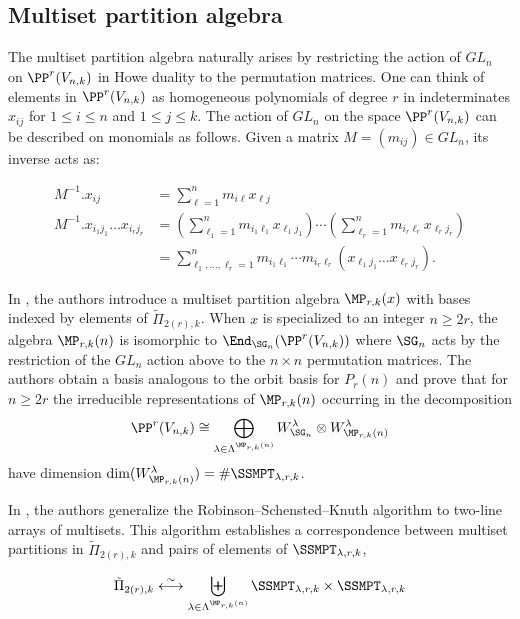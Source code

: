 \subsection{Multiset partition algebra}

The multiset partition algebra naturally arises by restricting the action of $GL_n$ on $\PP^r(V_{n,k})$ in Howe duality to the permutation matrices. One can think of elements in $\PP^r(V_{n,k})$ as homogeneous polynomials of degree $r$ in indeterminates $x_{ij}$ for $1\leq i\leq n$ and $1\leq j\leq k$. The action of $GL_n$ on the space $\PP^r(V_{n,k})$ can be described on monomials as follows. Given a matrix $M=(m_{ij})\in GL_n$, its inverse acts as:

\begin{align}
    M^{-1}.x_{ij}&=\sum_{\ell=1}^n m_{i\ell}x_{\ell j}\nonumber\\
    M^{-1}.x_{i_1j_1}\dots x_{i_rj_r}&=\left(\sum_{\ell_1=1}^n m_{i_1\ell_1}x_{\ell_1 j_1}\right)\cdots\left(\sum_{\ell_r=1}^n m_{i_r\ell_r}x_{\ell_r j_r}\right)\nonumber\\
    &=\sum_{\ell_1,\dots,\ell_r=1}^n m_{i_1\ell_1}\cdots m_{i_r\ell_r} (x_{\ell_1j_1}\dots x_{\ell_rj_r}).\label{eq:Ua_computation}
\end{align}

In \cite{orellana2020howe}, the authors introduce a multiset partition algebra $\MP_{r,k}(x)$ with bases indexed by elements of $\tilde\Pi_{2(r),k}$. When $x$ is specialized to an integer $n\geq 2r$, the algebra $\MP_{r,k}(n)$ is isomorphic to $\End_{\SG_n}(\PP^r(V_{n,k}))$ where $\SG_n$ acts by the restriction of the $GL_n$ action above to the $n\times n$ permutation matrices. The authors obtain a basis analogous to the orbit basis for $P_r(n)$ and prove that for $n\geq 2r$ the irreducible representations of $\MP_{r,k}(n)$ occurring in the decomposition \begin{align}
    \PP^r(V_{n,k})\cong\bigoplus_{\lambda\in\Lambda^{\MP_{r,k}(n)}}W_{\SG_n}^\lambda\otimes W_{\MP_{r,k}(n)}^\lambda \label{eq:mprk_decomp}
\end{align} have dimension $\dim(W_{\MP_{r,k}(n)}^\lambda)=\#\SSMPT_{\lambda,r,k}$.

In \cite{MR4090833}, the authors generalize the Robinson–Schensted–Knuth algorithm to two-line arrays of multisets. This algorithm establishes a correspondence between multiset partitions in $\tilde\Pi_{2(r),k}$ and pairs of elements of $\SSMPT_{\lambda,r,k}$, 

\[\tilde\Pi_{2(r),k}\stackrel{\sim}{\longleftrightarrow}\biguplus_{\lambda\in\Lambda^{\MP_{r,k}(n)}}\SSMPT_{\lambda,r,k}\times \SSMPT_{\lambda,r,k}\]

